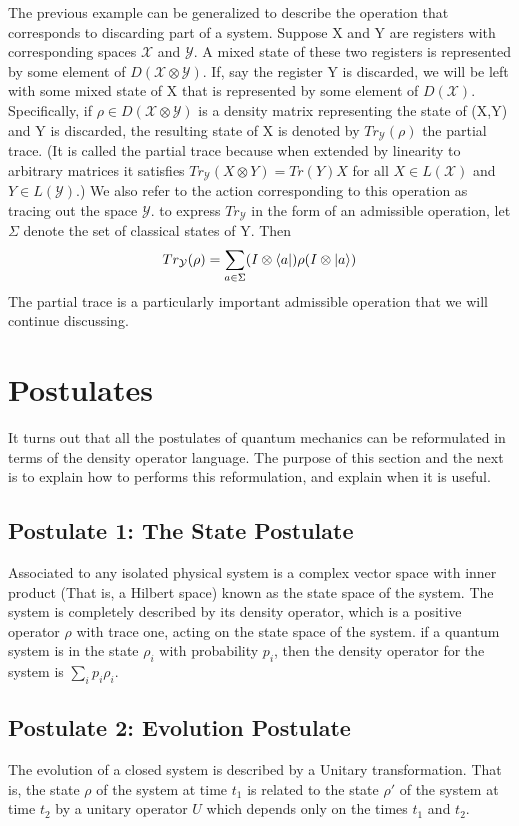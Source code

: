 \documentclass[12pt, oneside]{book}
\theoremstyle{definition}
\theoremstyle{definition}
\theoremstyle{remark}
\begin{document}
The previous example can be generalized to describe the operation that corresponds to discarding part of a system. Suppose X and Y are registers with corresponding spaces $\mathcal{X}$ and $\mathcal{Y}$. A mixed state of these two registers is represented by some element of $D(\mathcal{X}\otimes \mathcal{Y})$. If, say the register Y is discarded, we will be left with some mixed state of X that is represented by some element of $D(\mathcal{X})$. Specifically, if $\rho \in D(\mathcal{X}\otimes \mathcal{Y})$ is a density matrix representing the state of (X,Y) and Y is discarded, the resulting state of X is denoted by $Tr_{\mathcal{Y}} (\rho)$ the partial trace. (It is called the partial trace because when extended by linearity to arbitrary matrices it satisfies $Tr_{\mathcal{Y}} (X \otimes Y)=Tr(Y)X$ for all $X \in L(\mathcal{X})$ and $Y\in L(\mathcal{Y})$.) We also refer to the action corresponding to this operation as tracing out the space $\mathcal{Y}$. to express $Tr_{\mathcal{Y}}$ in the form of an admissible operation, let $\Sigma$ denote the set of classical states of Y. Then
\[
Tr_{\mathcal{Y}}(\rho) = \sum_{a\in\Sigma} (I\otimes \bra{a})\rho(I\otimes \ket{a})
\]
The partial trace is a particularly important admissible operation that we will continue discussing.
\section{Postulates}
It turns out that all the postulates of quantum mechanics can be reformulated in terms of the density operator language. The purpose of this section and the next is to explain how to performs this reformulation, and explain when it is useful.
\subsection{Postulate 1: The State Postulate}
Associated to any isolated physical system is a complex vector space with inner product (That is, a Hilbert space) known as the state space of the system. The system is completely described by its density operator, which is a positive operator $\rho$ with trace one, acting on the state space of the system. if a quantum system is in the state $\rho_i$ with probability $p_i$, then the density operator for the system is $\sum_i p_i\rho_i$.

\subsection{Postulate 2: Evolution Postulate}
The evolution of a closed system is described by a Unitary transformation. That is, the state $\rho$ of the system at time $t_1$ is related to the state $\rho'$ of the system at time $t_2$ by a unitary operator $U$ which depends only on the times $t_1$ and $t_2$.
\end{document}
